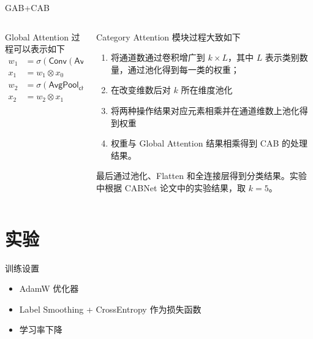 \documentclass[9pt, aspectratio=1610]{beamer}
\begin{document}
    \begin{frame}{GAB+CAB}
    \begin{columns}
        
        \begin{column}{0.5\textwidth}
            Global Attention 过程可以表示如下
            $$
                \begin{aligned}
                w_1 &=\sigma(\mathsf{Conv}(\mathsf{AvgPool}(x_0)))\\
                x_1 &= w_1 \otimes x_0\\
                w_2 &=\sigma(\mathsf{AvgPool_{channel}}(x_1))\\
                x_2 &= w_2 \otimes x_1
                \end{aligned}
            $$
        \end{column}
        \begin{column}{0.5\textwidth}
            Category Attention 模块过程大致如下
            \begin{enumerate}
                \item 将通道数通过卷积增广到 $k\times L$，其中 $L$ 表示类别数量，通过池化得到每一类的权重；
                \item 在改变维数后对 $k$ 所在维度池化
                \item 将两种操作结果对应元素相乘并在通道维数上池化得到权重
                \item 权重与 Global Attention 结果相乘得到 CAB 的处理结果。
            \end{enumerate}
            最后通过池化、Flatten 和全连接层得到分类结果。实验中根据 CABNet 论文中的实验结果，取 $k=5$。
        \end{column}
    \end{columns}
    \end{frame}

\section{实验}

    \begin{frame}{训练设置}
        \begin{itemize}
            \item AdamW 优化器
            \item Label Smoothing + CrossEntropy 作为损失函数
            \item 学习率下降
        \end{itemize}
    \end{frame}
\end{document}
